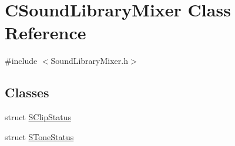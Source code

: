 \hypertarget{classCSoundLibraryMixer}{}\section{C\+Sound\+Library\+Mixer Class Reference}
\label{classCSoundLibraryMixer}


{\ttfamily \#include $<$Sound\+Library\+Mixer.\+h$>$}

\subsection*{Classes}
\begin{DoxyCompactItemize}
\item 
struct \hyperlink{structCSoundLibraryMixer_1_1SClipStatus}{S\+Clip\+Status}
\item 
struct \hyperlink{structCSoundLibraryMixer_1_1SToneStatus}{S\+Tone\+Status}
\end{DoxyCompactItemize}
